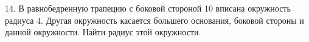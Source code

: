 14. В равнобедренную трапецию с боковой стороной 10 вписана окружность радиуса 4. Другая окружность касается большего основания, боковой стороны и данной окружности. Найти радиус этой окружности.\\
